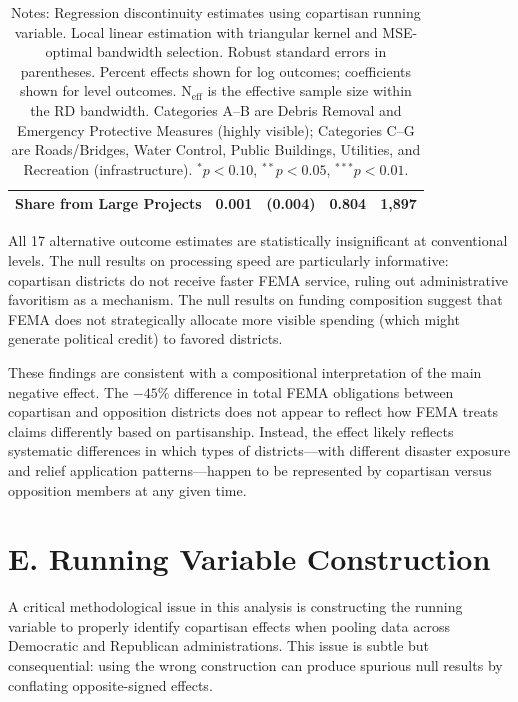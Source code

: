 \documentclass[12pt,letterpaper,oneside]{book}
\begin{document}
\begin{table}[H]
\begin{tabular}{lcccc}
\quad Share from Large Projects & 0.001 & (0.004) & 0.804 & 1,897 \\
\bottomrule
\end{tabular}
\caption*{\footnotesize Notes: Regression discontinuity estimates using copartisan running variable. Local linear estimation with triangular kernel and MSE-optimal bandwidth selection. Robust standard errors in parentheses. Percent effects shown for log outcomes; coefficients shown for level outcomes. N$_{\text{eff}}$ is the effective sample size within the RD bandwidth. Categories A--B are Debris Removal and Emergency Protective Measures (highly visible); Categories C--G are Roads/Bridges, Water Control, Public Buildings, Utilities, and Recreation (infrastructure). $^{*}p<0.10$, $^{**}p<0.05$, $^{***}p<0.01$.}
\end{table}

All 17 alternative outcome estimates are statistically insignificant at conventional levels. The null results on processing speed are particularly informative: copartisan districts do not receive faster FEMA service, ruling out administrative favoritism as a mechanism. The null results on funding composition suggest that FEMA does not strategically allocate more visible spending (which might generate political credit) to favored districts.

These findings are consistent with a compositional interpretation of the main negative effect. The $-45\%$ difference in total FEMA obligations between copartisan and opposition districts does not appear to reflect how FEMA treats claims differently based on partisanship. Instead, the effect likely reflects systematic differences in which types of districts---with different disaster exposure and relief application patterns---happen to be represented by copartisan versus opposition members at any given time.


\section*{E. Running Variable Construction}

A critical methodological issue in this analysis is constructing the running variable to properly identify copartisan effects when pooling data across Democratic and Republican administrations. This issue is subtle but consequential: using the wrong construction can produce spurious null results by conflating opposite-signed effects.
\end{document}
